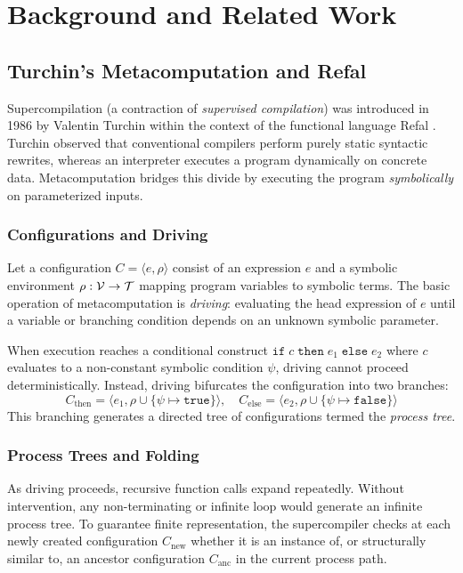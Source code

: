 \chapter{Background and Related Work}
\label{chap:background}

\section{Turchin's Metacomputation and Refal}
\label{sec:background:turchin}

Supercompilation (a contraction of \emph{supervised compilation}) was introduced in 1986 by Valentin Turchin within the context of the functional language Refal \citep{turchin1986concept}. Turchin observed that conventional compilers perform purely static syntactic rewrites, whereas an interpreter executes a program dynamically on concrete data. Metacomputation bridges this divide by executing the program \emph{symbolically} on parameterized inputs.

\subsection{Configurations and Driving}
Let a configuration $C = \langle e, \rho \rangle$ consist of an expression $e$ and a symbolic environment $\rho : \mathcal{V} \to \mathcal{T}$ mapping program variables to symbolic terms. The basic operation of metacomputation is \emph{driving}: evaluating the head expression of $e$ until a variable or branching condition depends on an unknown symbolic parameter. 

When execution reaches a conditional construct $\mathtt{if}\; c \; \mathtt{then}\; e_1 \;\mathtt{else}\; e_2$ where $c$ evaluates to a non-constant symbolic condition $\psi$, driving cannot proceed deterministically. Instead, driving bifurcates the configuration into two branches:
\begin{equation}
C_{\text{then}} = \langle e_1, \rho \cup \{\psi \mapsto \mathtt{true}\} \rangle, \quad
C_{\text{else}} = \langle e_2, \rho \cup \{\psi \mapsto \mathtt{false}\} \rangle
\end{equation}
This branching generates a directed tree of configurations termed the \emph{process tree}.

\subsection{Process Trees and Folding}
As driving proceeds, recursive function calls expand repeatedly. Without intervention, any non-terminating or infinite loop would generate an infinite process tree. To guarantee finite representation, the supercompiler checks at each newly created configuration $C_{\text{new}}$ whether it is an instance of, or structurally similar to, an ancestor configuration $C_{\text{anc}}$ in the current process path.

